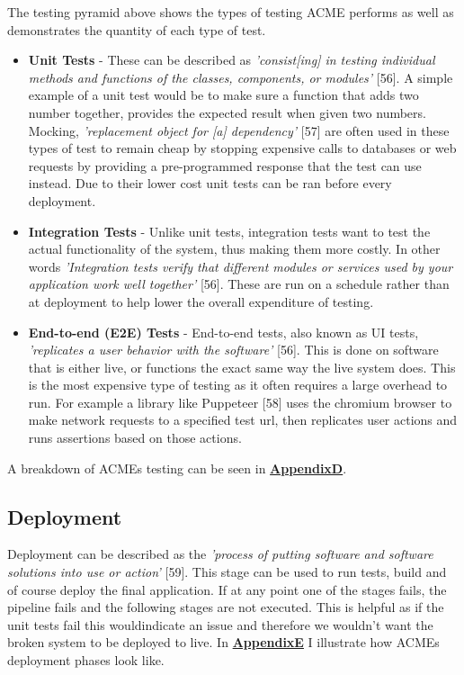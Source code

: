   The testing pyramid above shows the types of testing ACME performs as well as demonstrates the quantity of each type of test.
  \begin{itemize}
    \item \textbf{Unit Tests} - These can be described as \textit{'consist[ing] in testing individual methods and functions of the classes, components, 
    or modules'} [56]. A simple example of a unit test would be to make sure a function that adds two number together, provides the expected result
    when given two numbers. Mocking, \textit{'replacement object for [a] dependency'} [57] are often used in these types of test to remain cheap by
    stopping expensive calls to databases or web requests by providing a pre-programmed response that the test can use instead. Due to their 
    lower cost unit tests can be ran before every deployment.

    \item \textbf{Integration Tests} - Unlike unit tests, integration tests want to test the actual functionality of the system, thus 
    making them more costly. In other words \textit{'Integration tests verify that different modules or services used by your application work well
    together'} [56]. These are run on a schedule rather than at deployment to help lower the overall expenditure of testing. 
  
    \item \textbf{End-to-end (E2E) Tests} - End-to-end tests, also known as UI tests, \textit{'replicates a user behavior with the software'} [56].
    This is done on software that is either live, or functions the exact same way the live system does. This is the most expensive type of testing as
    it often requires a large overhead to run. For example a library like Puppeteer [58] uses the chromium browser to make network requests to a 
    specified test url, then replicates user actions and runs assertions based on those actions.
    
  \end{itemize}

  A breakdown of ACMEs testing can be seen in \hyperref[sec:AppendixD]{\textbf{AppendixD}}.

  \subsection{Deployment}
  \label{sec:Deployment}

  Deployment can be described as the \textit{'process of putting software and software solutions into use or action'} [59]. This stage can be
  used to run tests, build and of course deploy the final application. If at any point one of the stages fails, the pipeline fails and the following 
  stages are not executed. This is helpful as if the unit tests fail this wouldindicate an issue and therefore we wouldn't want the broken system to 
  be deployed to live. In \hyperref[sec:AppendixE]{\textbf{AppendixE}} I illustrate how ACMEs deployment phases look like.

\newpage